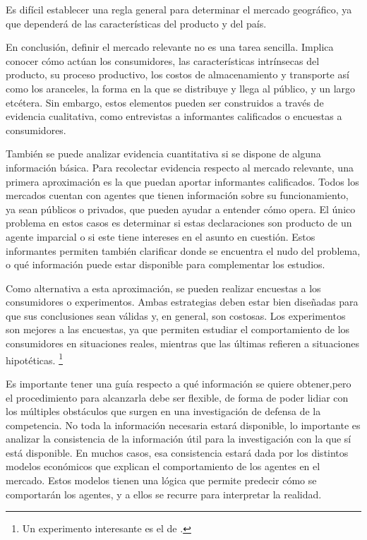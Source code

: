 \documentclass[
  12pt,
  spanish,
]{book}
\begin{document}
Es difícil establecer una regla general para determinar el mercado
geográfico, ya que dependerá de las características del producto y del
país.

En conclusión, definir el mercado relevante no es una tarea sencilla.
Implica conocer cómo actúan los consumidores, las características
intrínsecas del producto, su proceso productivo, los costos de
almacenamiento y transporte así como los aranceles, la forma en la que
se distribuye y llega al público, y un largo etcétera. Sin embargo,
estos elementos pueden ser construidos a través de evidencia
cualitativa, como entrevistas a informantes calificados o encuestas a
consumidores.

También se puede analizar evidencia cuantitativa si se dispone de alguna
información básica. Para recolectar evidencia respecto al mercado
relevante, una primera aproximación es la que puedan aportar informantes
calificados. Todos los mercados cuentan con agentes que tienen
información sobre su funcionamiento, ya sean públicos o privados, que
pueden ayudar a entender cómo opera. El único problema en estos casos es
determinar si estas declaraciones son producto de un agente imparcial o
si este tiene intereses en el asunto en cuestión. Estos informantes
permiten también clarificar donde se encuentra el nudo del problema, o
qué información puede estar disponible para complementar los estudios.

Como alternativa a esta aproximación, se pueden realizar encuestas a los
consumidores o experimentos. Ambas estrategias deben estar bien
diseñadas para que sus conclusiones sean válidas y, en general, son
costosas. Los experimentos son mejores a las encuestas, ya que permiten
estudiar el comportamiento de los consumidores en situaciones reales,
mientras que las últimas refieren a situaciones hipotéticas. \footnote{Un
  experimento interesante es el de \citet{Conlon2013}.}

Es importante tener una guía respecto a qué información se quiere
obtener,pero el procedimiento para alcanzarla debe ser flexible, de
forma de poder lidiar con los múltiples obstáculos que surgen en una
investigación de defensa de la competencia. No toda la información
necesaria estará disponible, lo importante es analizar la consistencia
de la información útil para la investigación con la que sí está
disponible. En muchos casos, esa consistencia estará dada por los
distintos modelos económicos que explican el comportamiento de los
agentes en el mercado. Estos modelos tienen una lógica que permite
predecir cómo se comportarán los agentes, y a ellos se recurre para
interpretar la realidad.
\end{document}
